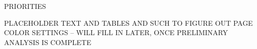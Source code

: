 \begin{table}[H]

\end{table}
\pagebreak

\textcolor{ccorange}{PRIORITIES}

PLACEHOLDER TEXT AND TABLES AND SUCH TO FIGURE OUT PAGE COLOR SETTINGS -- WILL FILL IN LATER, ONCE PRELIMINARY ANALYSIS IS COMPLETE
\pagebreak
\pagestyle{plain}
\pagecolor{ccfuschia}
\pagebreak
{}
\pagestyle{fancy}
\fancyhf{}
\renewcommand{\chaptermark}[1]{\markboth{#1}{}}
\fancyfoot[LE,RO]{\thepage}


